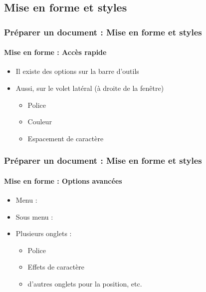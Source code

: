 \documentclass[xcolor=table]{beamer}
\begin{document}
\subsection{Mise en forme et styles}

\begin{frame}
\frametitle{Préparer un document : Mise en forme et styles}
\framesubtitle{Mise en forme : Accès rapide}

\begin{minipage}{0.64\textwidth}
\begin{itemize}
	\item Il existe des options sur la barre d'outils
	\item Aussi, sur le volet latéral (à droite de la fenêtre)
	\begin{itemize}
		\item Police
		\item Couleur 
		\item Espacement de caractère
	\end{itemize}
\end{itemize}

\hfill\null


\end{minipage}
\begin{minipage}{0.35\textwidth}
\end{minipage}

\end{frame}

\begin{frame}
\frametitle{Préparer un document : Mise en forme et styles}
\framesubtitle{Mise en forme : Options avancées}

\begin{minipage}{0.39\textwidth}
\begin{itemize}
	\item Menu :  
	\item Sous menu : 
	\item Plusieurs onglets : 
	\begin{itemize}
		\item Police
		\item Effets de caractère
		\item d'autres onglets pour la position, etc.
	\end{itemize}
\end{itemize}
\end{minipage}
\begin{minipage}{0.60\textwidth}
	
\end{minipage}

\end{frame}
\end{document}
